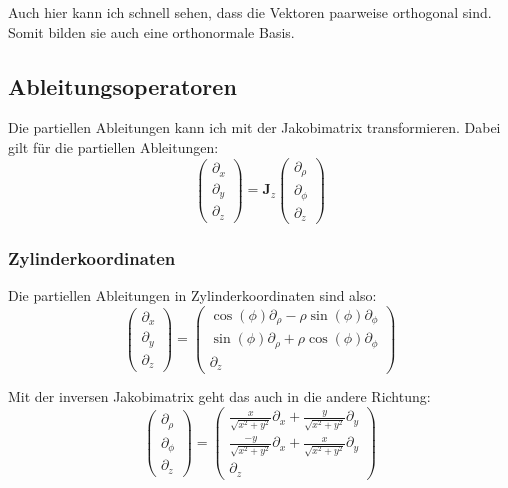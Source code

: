 \documentclass[11pt, ngerman]{article}
\newcommand{\tens}[1]{\boldsymbol{#1}}
\begin{document}
Auch hier kann ich schnell sehen, dass die Vektoren paarweise orthogonal sind. Somit bilden sie auch eine orthonormale Basis.

\subsection{Ableitungsoperatoren}

Die partiellen Ableitungen kann ich mit der Jakobimatrix transformieren. Dabei gilt für die partiellen Ableitungen:
\[
	\begin{pmatrix}
		\partial_x \\ \partial_y \\ \partial_z
	\end{pmatrix} = \tens J_z \begin{pmatrix}
		\partial_\rho \\ \partial_\phi \\ \partial_z
	\end{pmatrix}
\]

\subsubsection{Zylinderkoordinaten}


Die partiellen Ableitungen in Zylinderkoordinaten sind also:
\[
	\begin{pmatrix}
		\partial_x \\ \partial_y \\ \partial_z
	\end{pmatrix} =
	\begin{pmatrix}
		\cos(\phi) \partial_\rho - \rho \sin(\phi) \partial_\phi \\
		\sin(\phi) \partial_\rho + \rho \cos(\phi) \partial_\phi \\
		\partial_z
	\end{pmatrix}
\]

Mit der inversen Jakobimatrix geht das auch in die andere Richtung:
\[
	\begin{pmatrix}
		\partial_\rho \\ \partial_\phi \\ \partial_z
	\end{pmatrix} =
	\begin{pmatrix}
		\frac{x}{\sqrt{x^2 + y^2}} \partial_x + \frac{y}{\sqrt{x^2 + y^2}} \partial_y \\
			\frac{-y}{\sqrt{x^2 + y^2}} \partial_x + \frac{x}{\sqrt{x^2 + y^2}} \partial_y \\
		\partial_z
	\end{pmatrix}
\]
\end{document}
